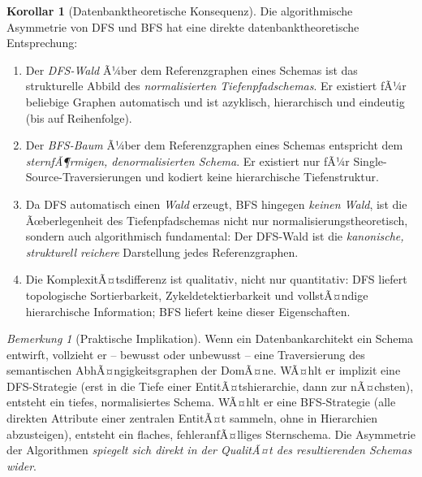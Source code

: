 ﻿\documentclass[12pt,a4paper]{article}
\theoremstyle{definition}
\newtheorem{corollary}[theorem]{Korollar}
\theoremstyle{remark}
\newtheorem{remark}{Bemerkung}[section]
\begin{document}
\begin{corollary}[Datenbanktheoretische Konsequenz]
\label{cor:konsequenz_asymmetrie}
Die algorithmische Asymmetrie von DFS und BFS hat eine direkte
datenbanktheoretische Entsprechung:

\begin{enumerate}[label=(\roman*)]
  \item Der \emph{DFS-Wald} Ã¼ber dem Referenzgraphen eines Schemas ist
        das strukturelle Abbild des \emph{normalisierten Tiefenpfadschemas}.
        Er existiert fÃ¼r beliebige Graphen automatisch und ist azyklisch,
        hierarchisch und eindeutig (bis auf Reihenfolge).
  \item Der \emph{BFS-Baum} Ã¼ber dem Referenzgraphen eines Schemas entspricht
        dem \emph{sternfÃ¶rmigen, denormalisierten Schema}. Er existiert nur
        fÃ¼r Single-Source-Traversierungen und kodiert keine hierarchische
        Tiefenstruktur.
  \item Da DFS automatisch einen \emph{Wald} erzeugt, BFS hingegen
        \emph{keinen Wald}, ist die Ãœberlegenheit des Tiefenpfadschemas
        nicht nur normalisierungstheoretisch, sondern auch algorithmisch
        fundamental: Der DFS-Wald ist die \emph{kanonische, strukturell
        reichere} Darstellung jedes Referenzgraphen.
  \item Die KomplexitÃ¤tsdifferenz ist qualitativ, nicht nur quantitativ:
        DFS liefert topologische Sortierbarkeit, Zykeldetektierbarkeit
        und vollstÃ¤ndige hierarchische Information; BFS liefert keine
        dieser Eigenschaften.
\end{enumerate}
\end{corollary}

\begin{remark}[Praktische Implikation]
Wenn ein Datenbankarchitekt ein Schema entwirft, vollzieht er -- bewusst
oder unbewusst -- eine Traversierung des semantischen AbhÃ¤ngigkeitsgraphen
der DomÃ¤ne. WÃ¤hlt er implizit eine DFS-Strategie (erst in die Tiefe einer
EntitÃ¤tshierarchie, dann zur nÃ¤chsten), entsteht ein tiefes, normalisiertes
Schema. WÃ¤hlt er eine BFS-Strategie (alle direkten Attribute einer zentralen
EntitÃ¤t sammeln, ohne in Hierarchien abzusteigen), entsteht ein flaches,
fehleranfÃ¤lliges Sternschema. Die Asymmetrie der Algorithmen \emph{spiegelt
sich direkt in der QualitÃ¤t des resultierenden Schemas wider}.
\end{remark}

\end{document}
